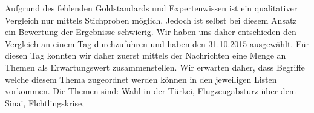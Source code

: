 Aufgrund des fehlenden Goldstandards und Expertenwissen ist ein qualitativer Vergleich nur mittels Stichproben möglich. Jedoch ist selbst bei diesem Ansatz ein Bewertung der Ergebnisse schwierig. Wir haben uns daher entschieden den Vergleich an einem Tag durchzuführen und haben den 31.10.2015 ausgewählt. 
Für diesen Tag konnten wir daher zuerst mittels der Nachrichten eine Menge an Themen als Erwartungswert zusammenstellen. Wir erwarten daher, dass Begriffe welche diesem Thema zugeordnet werden können in den jeweiligen Listen vorkommen. 
Die Themen sind: Wahl in der Türkei, Flugzeugabsturz über dem Sinai, Flchtlingskrise, 



\begin{table}
\centering
{}
\end{table}

